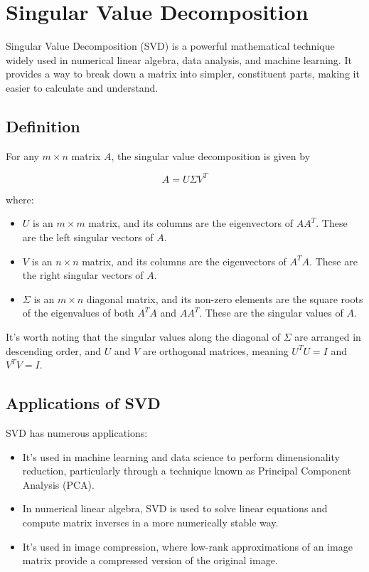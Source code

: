 \chapter{Singular Value Decomposition}

Singular Value Decomposition (SVD) is a powerful mathematical
technique widely used in numerical linear algebra, data analysis, and
machine learning. It provides a way to break down a matrix into
simpler, constituent parts, making it easier to calculate and
understand. 

\section{Definition}

For any $m \times n$ matrix $A$, the singular value decomposition is
given by

\begin{equation}
A = U \Sigma V^T
\end{equation}

where:

\begin{itemize}
\item $U$ is an $m \times m$ matrix, and its columns are the
  eigenvectors of $AA^T$. These are the left singular vectors of $A$.

\item $V$ is an $n \times n$ matrix, and its columns are the
  eigenvectors of $A^TA$. These are the right singular vectors of $A$.

\item $\Sigma$ is an $m \times n$ diagonal matrix, and its non-zero
  elements are the square roots of the eigenvalues of both $A^TA$ and
  $AA^T$. These are the singular values of $A$.
\end{itemize}

It's worth noting that the singular values along the diagonal of
$\Sigma$ are arranged in descending order, and $U$ and $V$ are
orthogonal matrices, meaning $U^TU = I$ and $V^TV = I$.

\section{Applications of SVD}

SVD has numerous applications:

\begin{itemize}
\item It's used in machine learning and data science to perform
  dimensionality reduction, particularly through a technique known as
  Principal Component Analysis (PCA).

\item In numerical linear algebra, SVD is used to solve linear
  equations and compute matrix inverses in a more numerically stable
  way.

\item It's used in image compression, where low-rank approximations of
  an image matrix provide a compressed version of the original image.
\end{itemize}

